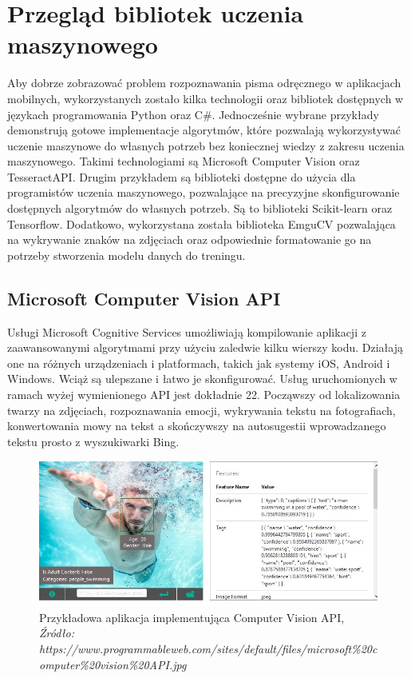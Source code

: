 \documentclass[brudnopis]{xmgr}
\begin{document}
\chapter{Przegląd bibliotek uczenia maszynowego}
Aby dobrze zobrazować problem rozpoznawania pisma odręcznego w aplikacjach mobilnych, wykorzystanych zostało kilka technologii oraz bibliotek dostępnych w językach programowania Python oraz C\#. Jednocześnie wybrane przykłady demonstrują gotowe implementacje algorytmów, które pozwalają wykorzystywać uczenie maszynowe do własnych potrzeb bez koniecznej wiedzy z zakresu uczenia maszynowego. Takimi technologiami są Microsoft Computer Vision\cite{9} oraz TesseractAPI\cite{10}. Drugim przykładem są biblioteki dostępne do użycia dla programistów uczenia maszynowego, pozwalające na precyzyjne skonfigurowanie dostępnych algorytmów do własnych potrzeb. Są to biblioteki Scikit-learn oraz Tensorflow. Dodatkowo, wykorzystana została biblioteka EmguCV pozwalająca na wykrywanie znaków na zdjęciach oraz odpowiednie formatowanie go na potrzeby stworzenia modelu danych do treningu.

\section{Microsoft Computer Vision API}

Usługi Microsoft Cognitive Services\cite{9} umożliwiają kompilowanie aplikacji z zaawansowanymi algorytmami przy użyciu zaledwie kilku wierszy kodu. Działają one na różnych urządzeniach i platformach, takich jak systemy iOS, Android i Windows. Wciąż są ulepszane i łatwo je skonfigurować. Usług uruchomionych w ramach wyżej wymienionego API jest dokładnie 22. Począwszy od lokalizowania twarzy na zdjęciach, rozpoznawania emocji, wykrywania tekstu na fotografiach, konwertowania mowy na tekst a skończywszy na autosugestii wprowadzanego tekstu prosto z wyszukiwarki Bing.

\begin{figure}[!tbh]
\centering
\includegraphics[width=.8\hsize]{fig/mscvapi}
\caption{Przykładowa aplikacja implementująca Computer Vision API, \emph{Źródło: https://www.programmableweb.com/sites/default/files/microsoft\%20computer\%20vision\%20API.jpg}}
\end{figure}
\newpage
\end{document}
